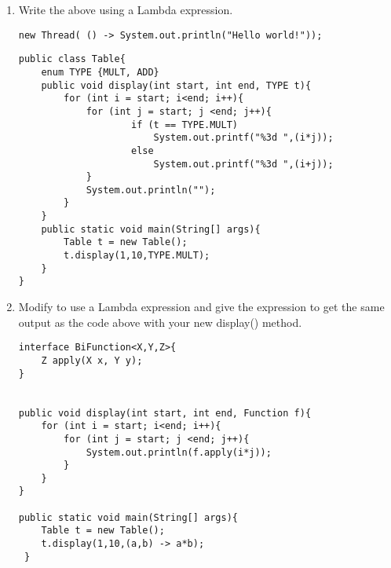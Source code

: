 \documentclass{article}
\begin{document}
\begin{enumerate}
\begin{lstlisting}
 	}
}
\end{lstlisting}
	\item Write the above using a Lambda expression.
\begin{lstlisting}
new Thread( () -> System.out.println("Hello world!"));
\end{lstlisting}	
\newpage
\begin{lstlisting}
public class Table{
 	enum TYPE {MULT, ADD}
 	public void display(int start, int end, TYPE t){
  		for (int i = start; i<end; i++){
   			for (int j = start; j <end; j++){
    				if (t == TYPE.MULT)
     					System.out.printf("%3d ",(i*j));
    				else 
     					System.out.printf("%3d ",(i+j));
   			}
   			System.out.println("");
  		}
 	}
 	public static void main(String[] args){
  		Table t = new Table();
  		t.display(1,10,TYPE.MULT);
 	}
}
\end{lstlisting}
	\item Modify to use a Lambda expression and give the expression to get the same output as the code above with your new display() method.
\begin{lstlisting}
interface BiFunction<X,Y,Z>{
	Z apply(X x, Y y);
}


public void display(int start, int end, Function f){
	for (int i = start; i<end; i++){
   		for (int j = start; j <end; j++){
   			System.out.println(f.apply(i*j));
   		}
  	}
}

public static void main(String[] args){
  	Table t = new Table();
  	t.display(1,10,(a,b) -> a*b);
 }
\end{lstlisting}
\end{enumerate}
\end{document}
